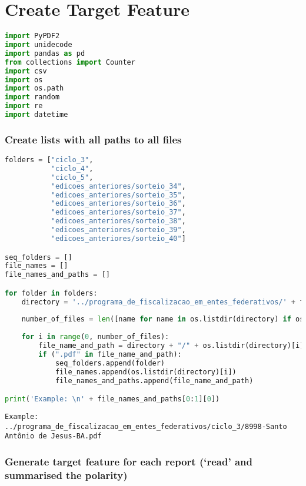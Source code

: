 \section{Create Target Feature}\label{create-target-feature}

\begin{lstlisting}[language=Python]
import PyPDF2
import unidecode
import pandas as pd
from collections import Counter
import csv
import os
import os.path
import random
import re
import datetime
\end{lstlisting}

\subsubsection{Create lists with all paths to all
files}\label{create-lists-with-all-paths-to-all-files}

\begin{lstlisting}[language=Python]
folders = ["ciclo_3",
           "ciclo_4",
           "ciclo_5",
           "edicoes_anteriores/sorteio_34",
           "edicoes_anteriores/sorteio_35",
           "edicoes_anteriores/sorteio_36",
           "edicoes_anteriores/sorteio_37",
           "edicoes_anteriores/sorteio_38",
           "edicoes_anteriores/sorteio_39",
           "edicoes_anteriores/sorteio_40"]

seq_folders = []
file_names = []
file_names_and_paths = []

for folder in folders:
    directory = '../programa_de_fiscalizacao_em_entes_federativos/' + folder
    
    number_of_files = len([name for name in os.listdir(directory) if os.path.isfile(os.path.join(directory, name))])
    
    for i in range(0, number_of_files):
        file_name_and_path = directory + "/" + os.listdir(directory)[i]
        if (".pdf" in file_name_and_path):
            seq_folders.append(folder)
            file_names.append(os.listdir(directory)[i])
            file_names_and_paths.append(file_name_and_path)

print('Example: \n' + file_names_and_paths[0:1][0])
\end{lstlisting}

\begin{lstlisting}
Example: 
../programa_de_fiscalizacao_em_entes_federativos/ciclo_3/8998-Santo Antônio de Jesus-BA.pdf
\end{lstlisting}

\subsubsection{\texorpdfstring{Generate target feature for each report
(`read' and summarised the
polarity)}{Generate target feature for each report (read and summarised the polarity)}}\label{generate-target-feature-for-each-report-read-and-summarised-the-polarity}

